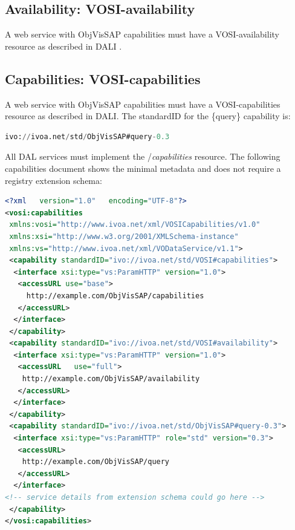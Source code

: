 \documentclass[11pt,a4paper]{ivoatex/ivoa}
\begin{document}
\subsection{Availability: VOSI-availability}
A web service with ObjVisSAP capabilities  \citep{2017ivoa.spec.0524G} must have a
VOSI-availability resource as described in DALI \citep{2017ivoa.spec.0517D}.

\subsection{Capabilities: VOSI-capabilities}
A web service with ObjVisSAP capabilities must have a VOSI-capabilities
resource as described in DALI. The standardID for the \{query\}
capability is:

\begin{lstlisting}[language=SQL]
ivo://ivoa.net/std/ObjVisSAP#query-0.3
\end{lstlisting}
All DAL services must implement the /\textit{capabilities} resource.
The following capabilities document shows the minimal metadata and does
not require a registry extension schema:

\begin{lstlisting}[language=XML]
<?xml	version="1.0"	encoding="UTF-8"?>
<vosi:capabilities
 xmlns:vosi="http://www.ivoa.net/xml/VOSICapabilities/v1.0"
 xmlns:xsi="http://www.w3.org/2001/XMLSchema-instance"
 xmlns:vs="http://www.ivoa.net/xml/VODataService/v1.1">
 <capability standardID="ivo://ivoa.net/std/VOSI#capabilities">
  <interface xsi:type="vs:ParamHTTP" version="1.0">
   <accessURL use="base">
     http://example.com/ObjVisSAP/capabilities
   </accessURL>
  </interface>
 </capability>
 <capability standardID="ivo://ivoa.net/std/VOSI#availability">
  <interface xsi:type="vs:ParamHTTP" version="1.0">
   <accessURL	use="full">
    http://example.com/ObjVisSAP/availability
   </accessURL>
  </interface>
 </capability>
 <capability standardID="ivo://ivoa.net/std/ObjVisSAP#query-0.3">
  <interface xsi:type="vs:ParamHTTP" role="std"	version="0.3">
   <accessURL>
    http://example.com/ObjVisSAP/query
   </accessURL>
  </interface>
<!-- service details from extension schema could go here -->
 </capability>
</vosi:capabilities>

\end{lstlisting}
\end{document}
